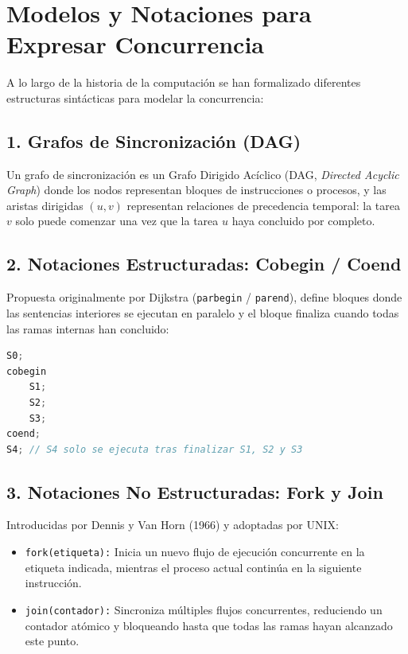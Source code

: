 \section{Modelos y Notaciones para Expresar Concurrencia}

A lo largo de la historia de la computación se han formalizado diferentes estructuras sintácticas para modelar la concurrencia:

\subsection{1. Grafos de Sincronización (DAG)}
Un grafo de sincronización es un Grafo Dirigido Acíclico (DAG, \textit{Directed Acyclic Graph}) donde los nodos representan bloques de instrucciones o procesos, y las aristas dirigidas $(u, v)$ representan relaciones de precedencia temporal: la tarea $v$ solo puede comenzar una vez que la tarea $u$ haya concluido por completo.

\subsection{2. Notaciones Estructuradas: Cobegin / Coend}
Propuesta originalmente por Dijkstra (\texttt{parbegin} / \texttt{parend}), define bloques donde las sentencias interiores se ejecutan en paralelo y el bloque finaliza cuando todas las ramas internas han concluido:
\begin{lstlisting}[language=C++]
S0;
cobegin
    S1;
    S2;
    S3;
coend;
S4; // S4 solo se ejecuta tras finalizar S1, S2 y S3
\end{lstlisting}

\subsection{3. Notaciones No Estructuradas: Fork y Join}
Introducidas por Dennis y Van Horn (1966) y adoptadas por UNIX:
\begin{itemize}
    \item \texttt{fork(etiqueta):} Inicia un nuevo flujo de ejecución concurrente en la etiqueta indicada, mientras el proceso actual continúa en la siguiente instrucción.
    \item \texttt{join(contador):} Sincroniza múltiples flujos concurrentes, reduciendo un contador atómico y bloqueando hasta que todas las ramas hayan alcanzado este punto.
\end{itemize}

